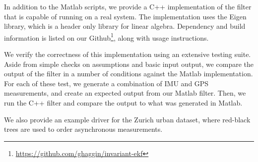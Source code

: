 In addition to the Matlab scripts, we provide a C++ implementation of the filter that is capable of running on a real system.  The implementation uses the Eigen library, which is a header only library for linear algebra.  Dependency and build information is listed on our Github\footnote{\href{https://github.com/ghaggin/invariant-ekf}{https://github.com/ghaggin/invariant-ekf}}, along with usage instructions.

We verify the correctness of this implementation using an extensive testing suite.  Aside from simple checks on assumptions and basic input output, we compare the output of the filter in a number of conditions against the Matlab implementation.  For each of these test, we generate a combination of IMU and GPS measurements, and create an expected output from our Matlab filter.  Then, we run the C++ filter and compare the output to what was generated in Matlab.

We also provide an example driver for the Zurich urban dataset, where red-black trees are used to order asynchronous measurements.

